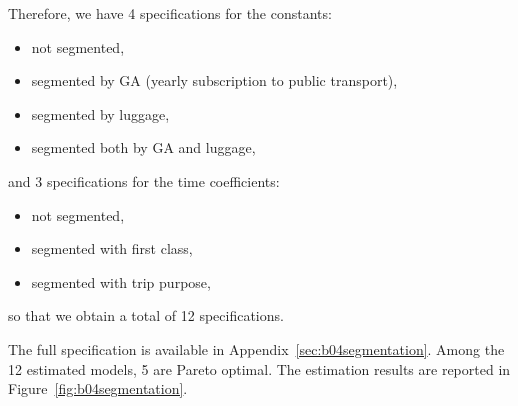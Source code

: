\documentclass[12pt,a4paper]{article}
\begin{document}
Therefore, we have 4 specifications for the constants:
\begin{itemize}
\item not segmented,
\item segmented by GA (yearly subscription to public transport),
\item segmented by luggage,
\item segmented both by GA and luggage,
\end{itemize}
and 3 specifications for the time coefficients:
\begin{itemize}
\item not segmented,
\item segmented with first class,
\item segmented with trip purpose,
\end{itemize}
so that we obtain a total of 12 specifications.

The
full specification is available in
Appendix~\ref{sec:b04segmentation}. Among the 12 estimated models, 5 are Pareto optimal. The estimation results are reported in Figure~\vref{fig:b04segmentation}. 
\end{document}

